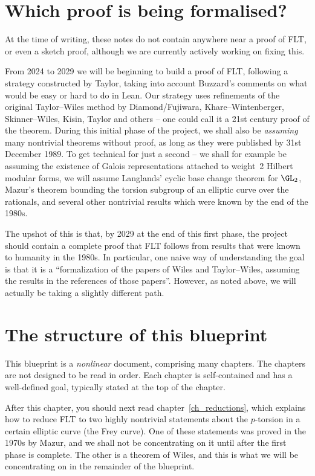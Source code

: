 \section{Which proof is being formalised?}

At the time of writing, these notes do not contain anywhere near a proof of FLT, or even a sketch proof,
although we are currently actively working on fixing this.

From 2024 to 2029 we will be beginning to build a proof of FLT, following a strategy
constructed by Taylor, taking into account Buzzard's comments on what would be easy or hard to do
in Lean. Our strategy uses refinements of the original Taylor--Wiles method by Diamond/Fujiwara,
Khare--Wintenberger, Skinner--Wiles, Kisin, Taylor and others -- one could call it a 21st century
proof of the theorem. During this initial phase of the project, we shall also be \emph{assuming}
many nontrivial theorems without proof, as long as they were published by 31st December 1989.
To get technical for just a second -- we shall for example be assuming the existence of Galois
representations attached to weight~2 Hilbert modular forms, we will assume Langlands' cyclic base
change theorem for $\GL_2$, Mazur's theorem bounding the torsion subgroup of an elliptic curve over
the rationals, and several other nontrivial results which were known by the end of the 1980s.

The upshot of this is that, by 2029 at the end of this first phase, the project should contain a
complete proof that FLT follows from results that were known to humanity in the 1980s. In
particular, one naive way of understanding the goal is that it is a ``formalization of the papers
of Wiles and Taylor--Wiles, assuming the results in the references of those papers''. However,
as noted above, we will actually be taking a slightly different path.

\section{The structure of this blueprint}

This blueprint is a \emph{nonlinear} document, comprising many chapters. The chapters
are not designed to be read in order. Each chapter is self-contained and has a well-defined goal,
typically stated at the top of the chapter.

After this chapter, you should next read chapter~\ref{ch_reductions}, which explains how to reduce FLT
to two highly nontrivial statements about the $p$-torsion in a certain elliptic curve (the Frey curve).
One of these statements was proved in the 1970s by Mazur, and we shall not be concentrating on
it until after the first phase is complete. The other is a theorem of Wiles, and this is what we will
be concentrating on in the remainder of the blueprint.

